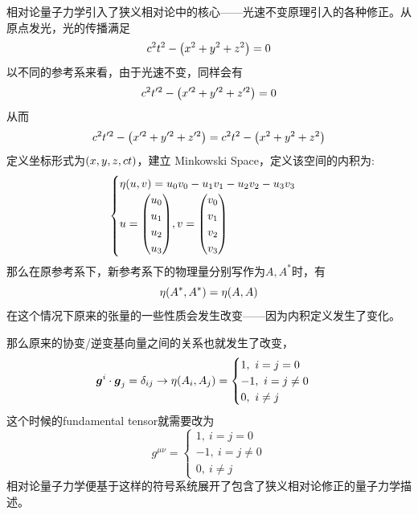 \documentclass[12pt,a4paper,openany,twoside]{book}
\numberwithin{equation}{section}
\begin{document}
        相对论量子力学引入了狭义相对论中的核心——光速不变原理引入的各种修正。从原点发光，光的传播满足
        \begin{equation}
          c^2t^2-\qty(x^2+y^2+z^2)=0
        \end{equation}
        以不同的参考系来看，由于光速不变，同样会有
        \begin{equation}
          c^2t'^2-\qty(x'^2+y'^2+z'^2)=0
        \end{equation}
        从而
        \begin{equation}
          c^2t'^2-\qty(x'^2+y'^2+z'^2)=c^2t^2-\qty(x^2+y^2+z^2)
        \end{equation}
        定义坐标形式为$\qty(x,y,z,ct)$，建立 Minkowski Space，定义该空间的内积为:
        \begin{equation}
          \begin{cases}
            \eta\qty(u,v)=u_0v_0-u_1v_1-u_2 v_2-u_3v_3\\
            u=\mqty(
              u_0\\
              u_1\\
              u_2\\
              u_3
            ),
            v=\mqty(
              v_0\\
              v_1\\
              v_2\\
              v_3
            )
          \end{cases}
        \end{equation}
        那么在原参考系下，新参考系下的物理量分别写作为$A,A^*$时，有
        \begin{equation}
          \eta\qty(A^*,A^*)=\eta\qty(A,A)
        \end{equation}
        在这个情况下原来的张量的一些性质会发生改变——因为内积定义发生了变化。

        那么原来的协变/逆变基向量之间的关系也就发生了改变，
        \begin{equation}
          \vb*{g}^i\cdot\vb*{g}_j=\delta_{ij}\rightarrow\eta\qty(A_i,A_j)=
          \begin{cases}
            1,\ i=j=0\\
            -1,\ i=j\neq 0\\
            0,\ i\neq j
          \end{cases}
        \end{equation}
        这个时候的fundamental tensor就需要改为
        \begin{equation}
          g^{\mu\nu} =
          \begin{cases}
            1,\ i=j=0\\
            -1,\ i=j\neq 0\\
            0,\ i\neq j
          \end{cases}
        \end{equation}
        相对论量子力学便基于这样的符号系统展开了包含了狭义相对论修正的量子力学描述。
\end{document}
